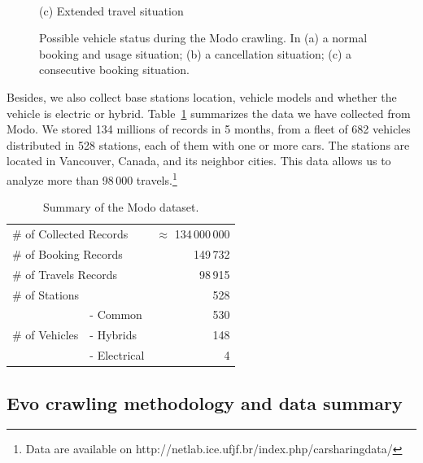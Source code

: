 \begin{figure}[!htb]
\begin{minipage}[b]{0.32\columnwidth}
     {\\(c) Extended travel situation}
    \end{minipage}
    \caption{Possible vehicle status during the Modo crawling. In (a) a normal booking and usage situation; (b) a cancellation situation; (c) a consecutive booking situation.}
    \label{fig:capturas}
\end{figure}

Besides, we also collect base stations location, vehicle models and whether the vehicle is electric or hybrid. 
Table~\ref{table:dataModo} summarizes the data we have collected from Modo. We stored 134 millions of records in 5 months, from a fleet of 682 vehicles distributed in 528 stations, each of them with one or more cars. The stations are located in Vancouver, Canada, and its neighbor cities. This data allows us to analyze more than %
98\,000 travels.\footnote{Data are available on http://netlab.ice.ufjf.br/index.php/carsharingdata/}

\begin{table}[tbh]
	\setlength{\tabcolsep}{2.3pt}
	\centering
		\begin{tabular}{llr}
		\hline
		\multicolumn{2}{l}{\# of Collected Records}  & $\approx$ 134\,000\,000\\
		\multicolumn{2}{l}{\# of Booking Records} & 149\,732  \\
		\multicolumn{2}{l}{\# of Travels Records} & 98\,915   \\
		\multicolumn{2}{l}{\# of Stations} & 528    \\\hline   
		\multirow{3}{*}{\# of Vehicles}       & - Common    & 530 \\
		                                      & - Hybrids  & 148 \\
		                                      & - Electrical & 4 \\
		                                      \hline
		\end{tabular}
	\caption{Summary of the Modo dataset.}
	\label{table:dataModo}
\end{table}



\subsection{Evo crawling methodology and data summary}

